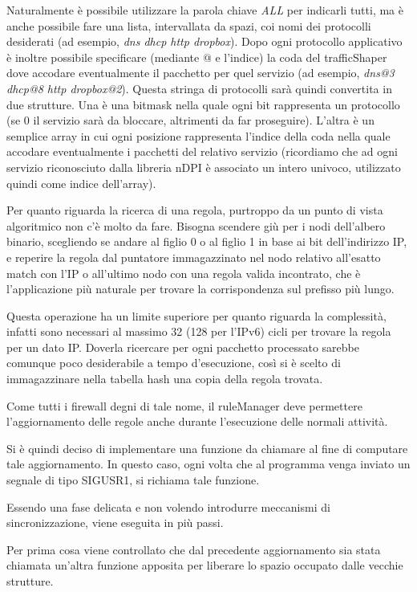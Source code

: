 Naturalmente è possibile utilizzare la parola chiave \emph{ALL} per indicarli tutti, ma è anche possibile fare una lista, intervallata da spazi, coi nomi dei protocolli desiderati (ad esempio, \emph{dns dhcp http dropbox}). Dopo ogni protocollo applicativo è inoltre possibile specificare (mediante @ e l'indice) la coda del trafficShaper dove accodare eventualmente il pacchetto per quel servizio (ad esempio, \emph{dns@3 dhcp@8 http dropbox@2}). Questa stringa di protocolli sarà quindi convertita in due strutture. Una è una bitmask nella quale ogni bit rappresenta un protocollo (se 0 il servizio sarà da bloccare, altrimenti da far proseguire). L'altra è un semplice array in cui ogni posizione rappresenta l'indice della coda nella quale accodare eventualmente i pacchetti del relativo servizio (ricordiamo che ad ogni servizio riconosciuto dalla libreria nDPI è associato un intero univoco, utilizzato quindi come indice dell'array).

Per quanto riguarda la ricerca di una regola, purtroppo da un punto di vista algoritmico non c'è molto da fare. Bisogna scendere giù per i nodi dell'albero binario, scegliendo se andare al figlio 0 o al figlio 1 in base ai bit dell'indirizzo IP, e reperire la regola dal puntatore immagazzinato nel nodo relativo all'esatto match con l'IP o all'ultimo nodo con una regola valida incontrato, che è l'applicazione più naturale per trovare la corrispondenza sul prefisso più lungo.

Questa operazione ha un limite superiore per quanto riguarda la complessità, infatti sono necessari al massimo 32 (128 per l'IPv6) cicli per trovare la regola per un dato IP. Doverla ricercare per ogni pacchetto processato sarebbe comunque poco desiderabile a tempo d'esecuzione, così si è scelto di immagazzinare nella tabella hash una copia della regola trovata.

Come tutti i firewall degni di tale nome, il ruleManager deve permettere l'aggiornamento delle regole anche durante l'esecuzione delle normali attività.

Si è quindi deciso di implementare una funzione da chiamare al fine di computare tale aggiornamento. In questo caso, ogni volta che al programma venga inviato un segnale di tipo SIGUSR1, si richiama tale funzione.

Essendo una fase delicata e non volendo introdurre meccanismi di sincronizzazione, viene eseguita in più passi.

Per prima cosa viene controllato che dal precedente aggiornamento sia stata chiamata un'altra funzione apposita per liberare lo spazio occupato dalle vecchie strutture.

